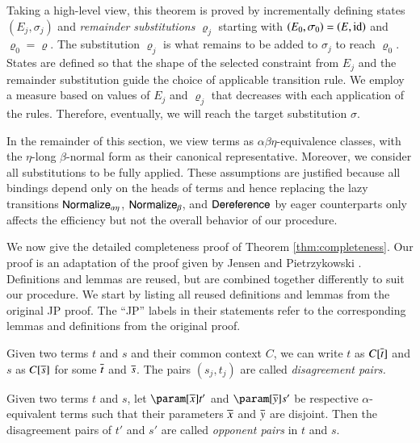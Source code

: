 Taking a high-level view, this theorem is proved by incrementally defining states
$(E_{j},\sigma_{j})$ and \emph{remainder} \emph{substitutions}
$\varrho_{j}$ starting with
$\left(E_{0},\sigma_{0}\right)=\left(E,\makeop{id}\right)$ and
$\varrho_{0}=\varrho$. The substitution $\varrho_{j}$ is what remains to be added
to $\sigma_{j}$ to reach $\varrho_{0}$. States are defined
so that the shape of the selected constraint from $E_{j}$ and the remainder
substitution guide the choice of applicable transition rule.
We employ a measure based on values of $E_j$ and $\varrho_j$ that decreases with 
each application of the rules. Therefore, eventually, we will reach the target substitution
$\sigma$.

In the remainder of this section, we view terms as
$\alpha\beta\eta$-equivalence classes, with the $\eta$-long $\beta$-normal
form as their canonical representative. Moreover, we consider all
substitutions to be fully applied. These assumptions are justified because
all bindings depend only on the heads of terms and hence replacing the lazy
transitions $\textsf{Normalize}_{\alpha\eta}$,
$\textsf{Normalize}_{\beta}$, and $\textsf{Dereference}$ by eager
counterparts only affects the efficiency but not the overall behavior of our
procedure.

We now give the detailed completeness proof of Theorem \ref{thm:completeness}.
Our proof is an adaptation of the proof given by Jensen and Pietrzykowski
\cite{jp-76-unif}.
Definitions and lemmas are reused, but are combined together differently to
suit our procedure. We start by listing all reused definitions and lemmas
from the original JP proof. The ``JP'' labels in
their statements refer to the corresponding lemmas and definitions from
the original proof.

\begin{defi}[{$\jp[1]D6$}] \label{unif:def:disagreement-pairs}
Given two terms $t$ and $s$ and their common context $C$, 
we can write $t$ as $C[\overline{t}]$ and $s$ as $C[\overline{s}]$
for some $\overline{t}$ and $\overline{s}$.
The pairs $(s_{j},t_{j})$ are called \emph{disagreement pairs.}
\end{defi}
\begin{defi}
[$\jp D1$]\label{unif:def:opponents}
Given two terms $t$ and $s$,
let $\param[\seq x] t'$ and $\param[\seq y] s'$ 
be respective $\alpha$-equivalent terms such that
their parameters $\overline{x}$ and $\overline{y}$ are disjoint.
Then the disagreement pairs of $t'$ and $s'$ are called 
\emph{opponent pairs} in $t$ and $s$.
\end{defi}

